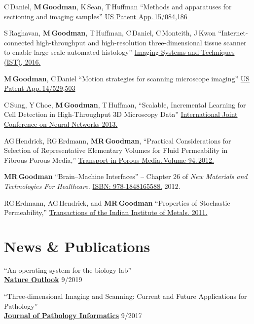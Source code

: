 \documentclass{res}
\begin{document}
\begin{resume}
  C\,Daniel, \textbf{M\,Goodman}, K\,Sean, T\,Huffman
  ``Methods and apparatuses for sectioning and imaging samples''
  \href{https://patents.google.com/patent/US20160290895A1/en}{US Patent App.\,15/084,186}

  S\,Raghavan, \textbf{M\,Goodman}, T\,Huffman, C\,Daniel, C\,Monteith, J\,Kwon
  ``Internet-connected high-throughput and high-resolution three-dimensional tissue scanner to
  enable large-scale automated histology''
  \href{https://doi.org/10.1109/IST.2016.7738254}{Imaging Systems and Techniques (IST), 2016.}

  \textbf{M\,Goodman}, C\,Daniel
  ``Motion strategies for scanning microscope imaging''
  \href{https://patents.google.com/patent/US20150138532A1/en}{US Patent App.\,14/529,503}

  C\,Sung, Y\,Choe, \textbf{M\,Goodman}, T\,Huffman,
  ``Scalable, Incremental Learning for Cell Detection in High-Throughput 3D Microscopy Data''
  \href{https://doi.org/10.1109/IJCNN.2013.6706769}{International Joint Conference on Neural Networks 2013.}

  AG\,Hendrick, RG\,Erdmann, \textbf{MR\,Goodman},
  ``Practical Considerations for Selection of Representative
  Elementary Volumes for Fluid Permeability in Fibrous Porous Media,''
  \href{http://dx.doi.org/10.1007/s11242-012-0051-8}{Transport in Porous Media.\,Volume 94.\,2012.}

  \textbf{MR\,Goodman}
  ``Brain--Machine Interfaces'' -- Chapter 26 of \textit{New Materials and Technologies For Healthcare.}
  \href{http://amzn.com/1848165587}{ISBN: 978-1848165588.} 2012.

  RG\,Erdmann, AG\,Hendrick, and \textbf{MR\,Goodman}
  ``Properties of Stochastic Permeability,''
  \href{http://dx.doi.org/10.1007/s12666-009-0038-5}{Transactions of the Indian Institute of Metals. 2011.}

\section{News \& Publications}
  ``An operating system for the biology lab'' \\
  \href{https://www.nature.com/articles/d41586-019-02875-z}{\textbf{Nature Outlook}} \hfill 9/2019

  ``Three-dimensional Imaging and Scanning: Current and Future Applications for Pathology'' \\
  \href{https://www.ncbi.nlm.nih.gov/pmc/articles/PMC5609355/}{\textbf{Journal of Pathology Informatics}} \hfill 9/2017
  

\end{resume}
\end{document}
